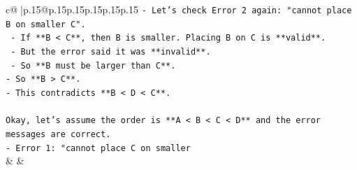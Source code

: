 \documentclass{article}
\begin{document}
{\begin{supertabular}{c@{$\;$}|p{.15\linewidth}@{}p{.15\linewidth}p{.15\linewidth}p{.15\linewidth}p{.15\linewidth}p{.15\linewidth}}
{{{\texttt{{-} Let's check Error 2 again: "cannot place B on smaller C".} \\
\texttt{    {-} If **B < C**, then B is smaller. Placing B on C is **valid**.} \\
\texttt{    {-} But the error said it was **invalid**.} \\
\texttt{    {-} So **B must be larger than C**.} \\
\texttt{{-} So **B > C**.} \\
\texttt{{-} This contradicts **B < D < C**.} \\
\\ 
\texttt{Okay, let's assume the order is **A < B < C < D** and the error messages are correct.} \\
\texttt{{-} Error 1: "cannot place C on smaller} \\
            }
        }
    }
    & & \\ \\


\end{supertabular}}
\end{document}
